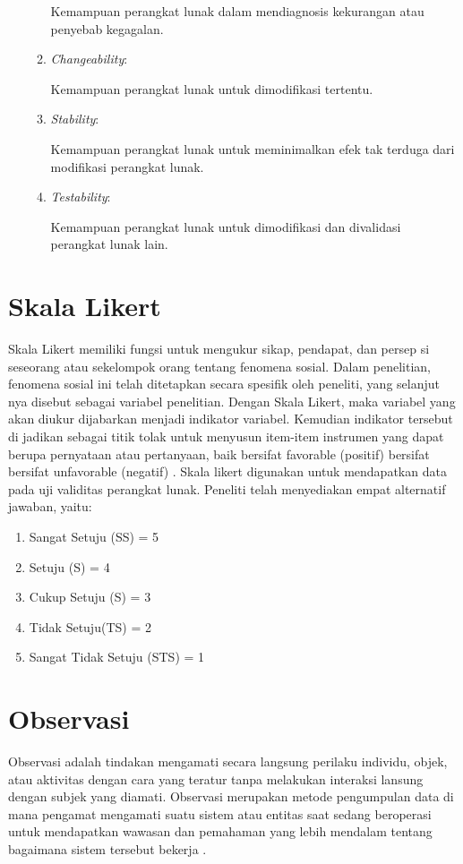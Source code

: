 \begin{enumerate}
\begin{enumerate}[label=\alph*)]
		Kemampuan perangkat lunak dalam mendiagnosis kekurangan atau
		penyebab kegagalan.
    \item \textit{Changeability}:
    
		Kemampuan perangkat lunak untuk dimodifikasi tertentu.
    \item \textit{Stability}:
    
		Kemampuan perangkat lunak untuk meminimalkan efek tak terduga dari
		modifikasi perangkat lunak. 
    \item \textit{Testability}:
    
		Kemampuan perangkat lunak untuk dimodifikasi dan divalidasi
		perangkat lunak lain.
	\end{enumerate}

\end{enumerate}

\section{Skala Likert}
Skala Likert memiliki fungsi untuk mengukur sikap, pendapat, dan persep si seseorang atau sekelompok orang tentang fenomena sosial. Dalam penelitian, fenomena sosial ini telah ditetapkan secara spesifik oleh peneliti, yang selanjut nya disebut sebagai variabel penelitian. Dengan Skala Likert, maka variabel yang akan diukur dijabarkan menjadi indikator variabel. Kemudian indikator tersebut di jadikan sebagai titik tolak untuk menyusun item-item instrumen yang dapat berupa pernyataan atau pertanyaan, baik bersifat favorable (positif) bersifat bersifat unfavorable (negatif) \cite{fendya2018pengembangan}. Skala likert digunakan untuk mendapatkan data pada uji validitas perangkat lunak. Peneliti telah menyediakan empat alternatif jawaban, yaitu: 
\begin{enumerate}
	\item Sangat Setuju (SS) = 5
	\item Setuju (S) = 4
	\item Cukup Setuju (S) = 3
	\item Tidak Setuju(TS) = 2
	\item Sangat Tidak Setuju (STS) = 1
\end{enumerate}

\section{Observasi}
Observasi adalah tindakan mengamati secara langsung perilaku individu, objek, atau aktivitas dengan cara yang teratur tanpa melakukan interaksi lansung dengan subjek yang diamati. Observasi merupakan metode pengumpulan data di mana pengamat mengamati suatu sistem atau entitas saat sedang beroperasi untuk mendapatkan wawasan dan pemahaman yang lebih mendalam tentang bagaimana sistem tersebut bekerja \cite{tilley2017systems}.

